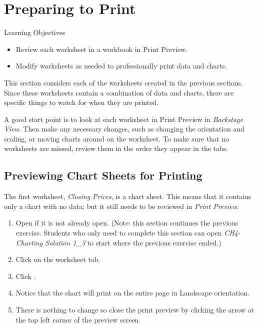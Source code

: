 \section{Preparing to Print}

\begin{center}
	\begin{objbox}{Learning Objectives}
		\begin{itemize}
			\setlength{\itemsep}{0pt}
			\setlength{\parskip}{0pt}
			\setlength{\parsep}{0pt}

			\item Review each worksheet in a workbook in Print Preview.
			\item Modify worksheets as needed to professionally print data and charts.
			
		\end{itemize}
	\end{objbox}
\end{center}

This section considers each of the worksheets created in the previous sections. Since these worksheets contain a combination of data and charts, there are specific things to watch for when they are printed.

A good start point is to look at each worksheet in Print Preview in \textit{Backstage View}. Then make any necessary changes, such as changing the orientation and scaling, or moving charts around on the worksheet. To make sure that no worksheets are missed, review them in the order they appear in the tabs.

\subsection{Previewing Chart Sheets for Printing}

The first worksheet, \textit{Closing Prices}, is a chart sheet. This means that it contains only a chart with no data; but it still needs to be reviewed in \textit{Print Preview}.

\begin{enumerate}
	\item Open  if it is not already open. (Note: this section continues the previous exercise. Students who only need to complete this section can open \textit{CH4-Charting Solution 1\_3} to start where the previous exercise ended.)
	\item Click on the  worksheet tab.
	\item Click .
	\item Notice that the chart will print on the entire page in Landscape orientation.
	\item There is nothing to change so close the print preview by clicking the arrow at the top left corner of the preview screen.
\end{enumerate}

